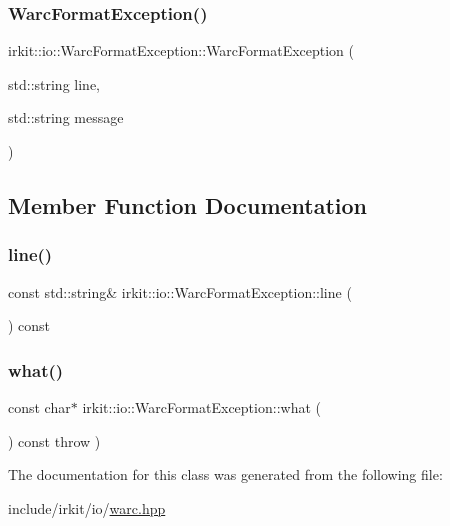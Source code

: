 \subsubsection{\texorpdfstring{Warc\+Format\+Exception()}{WarcFormatException()}}
{\footnotesize\ttfamily irkit\+::io\+::\+Warc\+Format\+Exception\+::\+Warc\+Format\+Exception (\begin{DoxyParamCaption}\item[{std\+::string}]{line,  }\item[{std\+::string}]{message }\end{DoxyParamCaption})\hspace{0.3cm}{\ttfamily [inline]}}



\subsection{Member Function Documentation}
\mbox{\label{classirkit_1_1io_1_1WarcFormatException_a7f2f93abda720fb08f9b367cab16d354}} 
\subsubsection{\texorpdfstring{line()}{line()}}
{\footnotesize\ttfamily const std\+::string\& irkit\+::io\+::\+Warc\+Format\+Exception\+::line (\begin{DoxyParamCaption}{ }\end{DoxyParamCaption}) const\hspace{0.3cm}{\ttfamily [inline]}}

\mbox{\label{classirkit_1_1io_1_1WarcFormatException_afbeda38d9f865635608b61a0e144c677}} 
\subsubsection{\texorpdfstring{what()}{what()}}
{\footnotesize\ttfamily const char$\ast$ irkit\+::io\+::\+Warc\+Format\+Exception\+::what (\begin{DoxyParamCaption}{ }\end{DoxyParamCaption}) const throw  ) \hspace{0.3cm}{\ttfamily [inline]}}



The documentation for this class was generated from the following file\+:\begin{DoxyCompactItemize}
\item 
include/irkit/io/\mbox{\hyperlink{warc_8hpp}{warc.\+hpp}}\end{DoxyCompactItemize}
